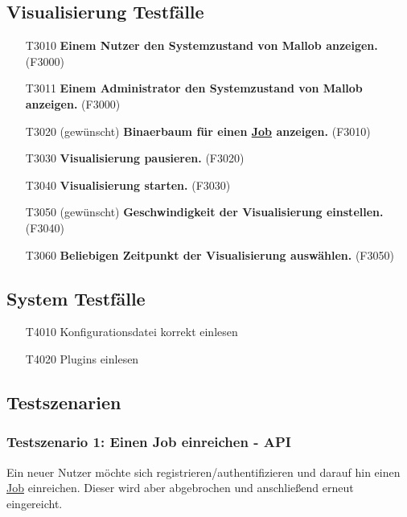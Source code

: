 \subsection{Visualisierung Testfälle}

\begin{itemize}
    \item[T3010] \textbf{Einem \gls{Nutzer} den Systemzustand von Mallob anzeigen.} (F3000)
    
    \item[T3011] \textbf{Einem \gls{Administrator} den Systemzustand von Mallob anzeigen.} (F3000)
    
    \item[T3020] (gewünscht) \textbf{\gls{Binaerbaum} für einen \hyperref[B:Jobs]{Job} anzeigen.} (F3010)
    
    \item[T3030] \textbf{Visualisierung pausieren.} (F3020)
    
    \item[T3040] \textbf{Visualisierung starten.} (F3030)
    
    \item[T3050] (gewünscht) \textbf{Geschwindigkeit der Visualisierung einstellen.} (F3040)
    
    \item[T3060] \textbf{Beliebigen Zeitpunkt der Visualisierung auswählen.} (F3050)
    
\end{itemize}

\subsection{System Testfälle}

\begin{itemize}
    \item[T4010] Konfigurationsdatei korrekt einlesen
    
    \item[T4020] Plugins einlesen
    
    
\end{itemize}

\subsection{Testszenarien}

\subsubsection{Testszenario 1: Einen Job einreichen - API}
Ein neuer \gls{Nutzer} möchte sich registrieren/authentifizieren und darauf hin einen \hyperref[B:Jobs]{Job} einreichen. Dieser wird aber abgebrochen und anschließend erneut eingereicht. 

